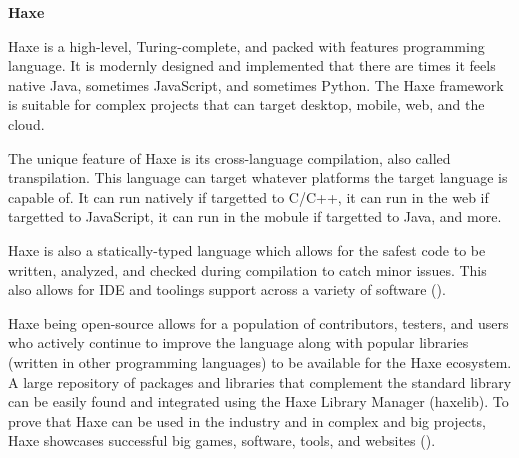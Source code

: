 \flushleft
\textbf{Haxe}\\
\justifying

\parx
Haxe is a high-level, Turing-complete, and packed with features programming language.
It is modernly designed and implemented that there are times it feels native Java,
sometimes JavaScript, and sometimes Python. The Haxe framework is suitable for complex
projects that can target desktop, mobile, web, and the cloud.

The unique feature of Haxe is its cross-language compilation, also called transpilation.
This language can target whatever platforms the target language is capable of. It can
run natively if targetted to C/C++, it can run in the web if targetted to JavaScript,
it can run in the mobule if targetted to Java, and more.

Haxe is also a statically-typed language which allows for the safest code to be written,
analyzed, and checked during compilation to catch minor issues. This also allows for
IDE and toolings support across a variety of software (\cite{coates_2018}).

Haxe being open-source allows for a population of contributors, testers, and users who
actively continue to improve the language along with popular libraries (written in other
programming languages) to be available for the Haxe ecosystem. A large repository of
packages and libraries that complement the standard library can be easily found and
integrated using the Haxe Library Manager (haxelib). To prove that Haxe can be used in
the industry and in complex and big projects, Haxe showcases successful big games,
software, tools, and websites (\cite{haxe_2020}).

